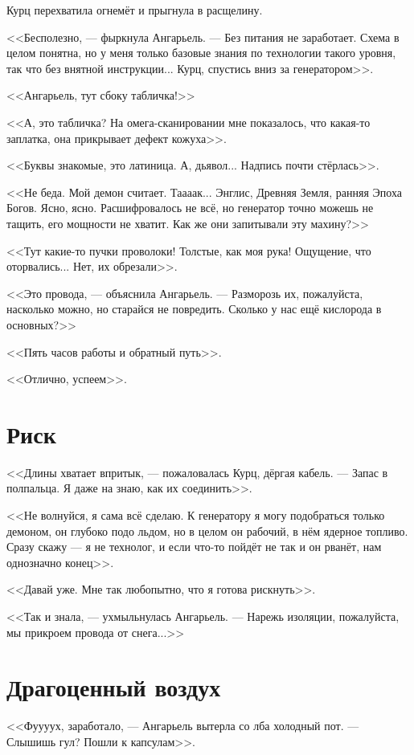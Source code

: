 Курц перехватила огнемёт и прыгнула в расщелину.

<<Бесполезно, --- фыркнула Ангарьель.
--- Без питания не заработает.
Схема в целом понятна, но у меня только базовые знания по технологии такого уровня, так что без внятной инструкции...
Курц, спустись вниз за генератором>>.

<<Ангарьель, тут сбоку табличка!>>

<<А, это табличка?
На омега-сканировании мне показалось, что какая-то заплатка, она прикрывает дефект кожуха>>.

<<Буквы знакомые, это латиница.
А, дьявол...
Надпись почти стёрлась>>.

<<Не беда.
Мой демон считает.
Таааак...
Энглис, Древняя Земля, ранняя Эпоха Богов.
Ясно, ясно.
Расшифровалось не всё, но генератор точно можешь не тащить, его мощности не хватит.
Как же они запитывали эту махину?>>

<<Тут какие-то пучки проволоки!
Толстые, как моя рука!
Ощущение, что оторвались...
Нет, их обрезали>>.

<<Это провода, --- объяснила Ангарьель.
--- Разморозь их, пожалуйста, насколько можно, но старайся не повредить.
Сколько у нас ещё кислорода в основных?>>

<<Пять часов работы и обратный путь>>.

<<Отлично, успеем>>.

\section{Риск}

<<Длины хватает впритык, --- пожаловалась Курц, дёргая кабель.
--- Запас в полпальца.
Я даже на знаю, как их соединить>>.

<<Не волнуйся, я сама всё сделаю.
К генератору я могу подобраться только демоном, он глубоко подо льдом, но в целом он рабочий, в нём ядерное топливо.
Сразу скажу --- я не технолог, и если что-то пойдёт не так и он рванёт, нам однозначно конец>>.

<<Давай уже.
Мне так любопытно, что я готова рискнуть>>.

<<Так и знала, --- ухмыльнулась Ангарьель.
--- Нарежь изоляции, пожалуйста, мы прикроем провода от снега...>>

\section{Драгоценный воздух}

<<Фуууух, заработало, --- Ангарьель вытерла со лба холодный пот.
--- Слышишь гул?
Пошли к капсулам>>.

